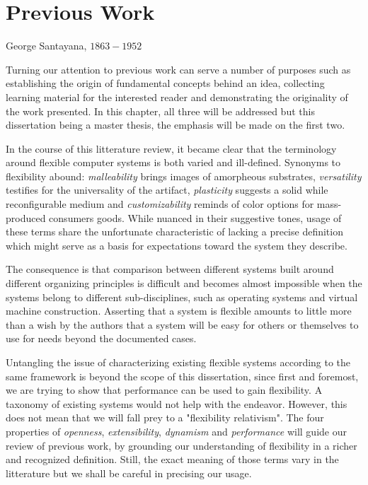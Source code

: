 \chapter{Previous Work}
\label{chap:PreviousWork} 

{George Santayana, $1863-1952$}

Turning our attention to previous work can serve a number of purposes such as
establishing the origin of fundamental concepts behind an idea, collecting
learning material for the interested reader and demonstrating the originality
of the work presented. In this chapter, all three will be addressed but this
dissertation being a master thesis, the emphasis will be made on the first two. 

In the course of this litterature review, it became clear that the
terminology around flexible computer systems is both varied and ill-defined.
Synonyms to flexibility abound: \textit{malleability} brings images of
amorpheous substrates, \textit{versatility} testifies for the universality of
the artifact, \textit{plasticity} suggests a solid while reconfigurable medium
and \textit{customizability} reminds of color options for mass-produced
consumers goods. While nuanced in their suggestive tones, usage of these terms
share the unfortunate characteristic of lacking a precise definition which
might serve as a basis for expectations toward the system they describe.

The consequence is that comparison between different systems built around
different organizing principles is difficult and becomes almost impossible when
the systems belong to different sub-disciplines, such as operating systems and
virtual machine construction. Asserting that a system is flexible amounts to
little more than a wish by the authors that a system will be easy for others or
themselves to use for needs beyond the documented cases.  

Untangling the issue of characterizing existing flexible systems according to
the same framework is beyond the scope of this dissertation, since first and
foremost, we are trying to show that performance can be used to gain
flexibility. A taxonomy of existing systems would not help with the endeavor.
However, this does not mean that we will fall prey to a "flexibility
relativism". The four properties of \textit{openness}, \textit{extensibility},
\textit{dynamism} and \textit{performance} will guide our review of previous
work, by grounding our understanding of flexibility in a richer and recognized
definition. Still, the exact meaning of those terms vary in the litterature but
we shall be careful in precising our usage.

